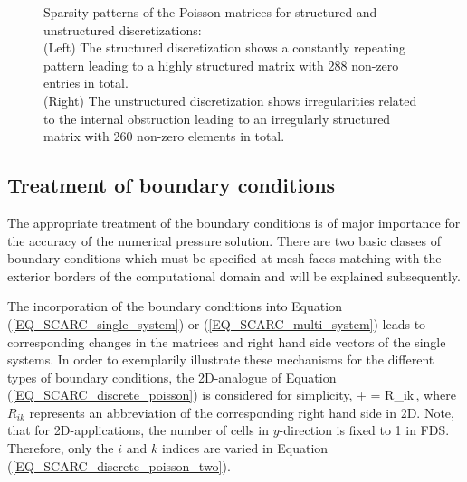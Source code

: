 \begin{figure}[H]
\begin{center}
\begin{minipage}[b]{0.475\textwidth}
\end{minipage}
\end{center}
\caption[Structured versus unstructured sparsity pattern]{Sparsity patterns of the Poisson matrices for structured and unstructured discretizations:\\
(Left) The structured discretization shows a constantly repeating pattern leading to a highly structured matrix with 288 non-zero entries in total. \\
(Right) The unstructured discretization shows irregularities related to the internal obstruction leading to an irregularly structured matrix with 260 non-zero elements in total.}
\label{FIG_structured_vs_unstructured_spy}
\end{figure}


\newpage


\subsection{Treatment of boundary conditions}
\label{SEC_SCARC_boundary_conditions}

The appropriate treatment of the boundary conditions is of major importance for the accuracy of the numerical pressure solution. There are two basic classes of boundary conditions which must be specified at mesh faces matching with the exterior borders of the computational domain and will be explained subsequently. 

The incorporation of the boundary conditions into Equation (\ref{EQ_SCARC_single_system}) or (\ref{EQ_SCARC_multi_system}) leads to corresponding changes in the matrices and right hand side vectors of the single systems. In order to exemplarily illustrate these mechanisms for the different types of boundary conditions, the 2D-analogue of Equation (\ref{EQ_SCARC_discrete_poisson}) is considered for simplicity,
\be
{} +
  = R_{ik}\,,
\label{EQ_SCARC_discrete_poisson_two}
\ee
where $R_{ik}$ represents an abbreviation of the corresponding right hand side in 2D.
Note, that for 2D-applications, the number of cells in $y$-direction is fixed to 1 in FDS. Therefore, only the $i$ and $k$ indices are varied in Equation (\ref{EQ_SCARC_discrete_poisson_two}).


